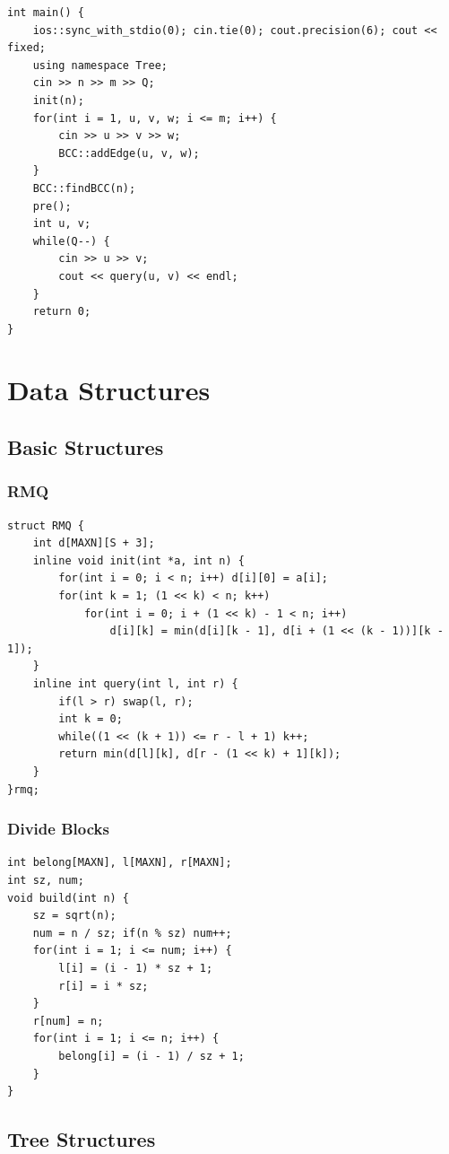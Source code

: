 \documentclass[10pt]{ctexart}
\begin{document}
{\begin{lstlisting}
int main() {
    ios::sync_with_stdio(0); cin.tie(0); cout.precision(6); cout << fixed;
    using namespace Tree;
    cin >> n >> m >> Q;
    init(n);
    for(int i = 1, u, v, w; i <= m; i++) {
        cin >> u >> v >> w;
        BCC::addEdge(u, v, w);
    }
    BCC::findBCC(n);
    pre();
    int u, v;
    while(Q--) {
        cin >> u >> v;
        cout << query(u, v) << endl;
    }
    return 0;
}
\end{lstlisting}




\newpage
\section{Data Structures}
\subsection{Basic Structures}
\subsubsection{RMQ}
\begin{lstlisting}
struct RMQ {
    int d[MAXN][S + 3];
    inline void init(int *a, int n) {
        for(int i = 0; i < n; i++) d[i][0] = a[i];
        for(int k = 1; (1 << k) < n; k++)
            for(int i = 0; i + (1 << k) - 1 < n; i++)
                d[i][k] = min(d[i][k - 1], d[i + (1 << (k - 1))][k - 1]);
    }
    inline int query(int l, int r) {
        if(l > r) swap(l, r);
        int k = 0;
        while((1 << (k + 1)) <= r - l + 1) k++;
        return min(d[l][k], d[r - (1 << k) + 1][k]);
    }
}rmq;
\end{lstlisting}
\subsubsection{Divide Blocks}
\begin{lstlisting}
int belong[MAXN], l[MAXN], r[MAXN];
int sz, num;
void build(int n) {
    sz = sqrt(n);
    num = n / sz; if(n % sz) num++;
    for(int i = 1; i <= num; i++) {
        l[i] = (i - 1) * sz + 1;
        r[i] = i * sz;
    }
    r[num] = n;
    for(int i = 1; i <= n; i++) {
        belong[i] = (i - 1) / sz + 1;
    }
}
\end{lstlisting}
\subsection{Tree Structures}
}
\end{document}
